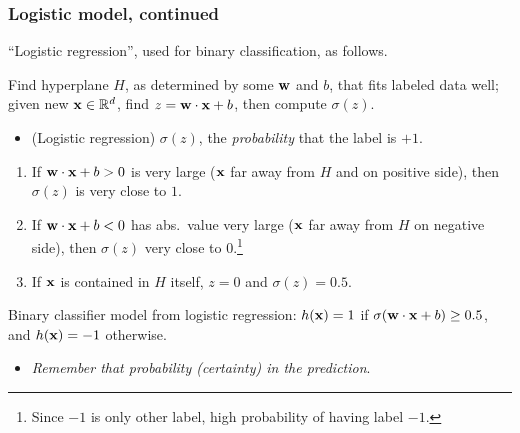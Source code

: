 \documentclass{beamer}
\theoremstyle{example}
\begin{document}
\begin{frame}
\frametitle{Logistic model, continued}
    ``Logistic regression'', used for binary classification, as follows.
    
    Find hyperplane $H$, as determined by some ${\bf w}$ and $b$, that fits labeled data well; given new ${\bf x}\in\mathbb R^d$, find $z = {\bf w}\cdot{\bf x}+b$, then compute $\sigma(z)$. 
    \begin{itemize}
        \item (Logistic regression) $\sigma(z)$, the \textit{probability} that the label is $+1$.
    \end{itemize}
    
    \pause
    \begin{enumerate}
        \item If ${\bf w}\cdot{\bf x}+b > 0$ is very large (${\bf x}$ far away from $H$ and on positive side), then  $\sigma(z)$ is very close to $1$.
        \item If ${\bf w}\cdot{\bf x}+b < 0$ has abs.\ value very large (${\bf x}$ far away from $H$ on negative side), then  $\sigma(z)$ very close to $0$.\footnote{Since $-1$ is only other label, high probability of having label $-1$.}
        \item If ${\bf x}$ is contained in $H$ itself, $z=0$ and $\sigma(z) = 0.5$.
    \end{enumerate}
    \pause
    Binary classifier model from logistic regression: $h({\bf x})=1$ if $\sigma({\bf w}\cdot{\bf x}+b) \ge 0.5$, and $h({\bf x})=-1$ otherwise. 
    \begin{itemize}
        \item \textit{Remember that probability (certainty) in the prediction}.
    \end{itemize}

\end{frame}
\end{document}
